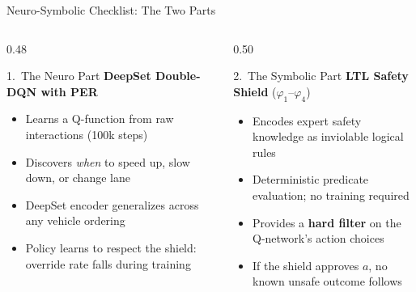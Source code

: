 \documentclass[aspectratio=169,10pt]{beamer}
\begin{document}

\begin{frame}{Neuro-Symbolic Checklist: The Two Parts}
  \begin{columns}[T]
    \begin{column}{0.48\textwidth}
      \begin{block}{1.\ The Neuro Part}
        \textcolor{neuralblue}{\textbf{DeepSet Double-DQN with PER}}
        \begin{itemize}[<2->]\small
          \item Learns a Q-function from raw interactions (100k steps)
          \item Discovers \emph{when} to speed up, slow down, or change lane
          \item DeepSet encoder generalizes across any vehicle ordering
          \item Policy learns to respect the shield: override rate falls during training
        \end{itemize}
      \end{block}
    \end{column}
    \begin{column}{0.50\textwidth}
      \pause
      \begin{block}{2.\ The Symbolic Part}
        \textcolor{symbolicorange}{\textbf{LTL Safety Shield}} (\(\varphi_1\)--\(\varphi_4\))
        \begin{itemize}[<+->]\small
          \item Encodes expert safety knowledge as inviolable logical rules
          \item Deterministic predicate evaluation; no training required
          \item Provides a \textbf{hard filter} on the Q-network's action choices
          \item If the shield approves \(a\), no known unsafe outcome follows
        \end{itemize}
      \end{block}
    \end{column}
  \end{columns}
\end{frame}
\end{document}
